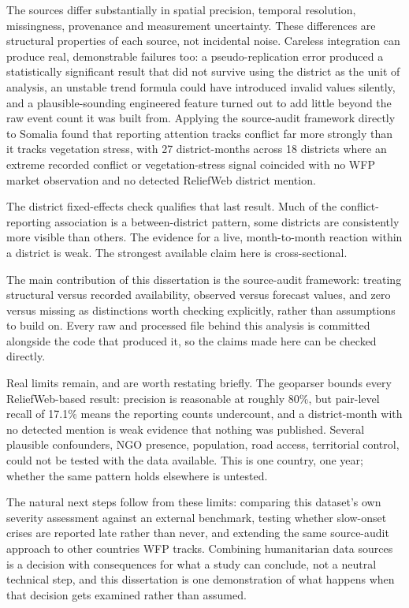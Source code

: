 \documentclass[12pt,a4paper]{article}
\begin{document}
The sources differ substantially in spatial precision, temporal resolution, missingness, provenance and measurement uncertainty. These differences are structural properties of each source, not incidental noise. Careless integration can produce real, demonstrable failures too: a pseudo-replication error produced a statistically significant result that did not survive using the district as the unit of analysis, an unstable trend formula could have introduced invalid values silently, and a plausible-sounding engineered feature turned out to add little beyond the raw event count it was built from. Applying the source-audit framework directly to Somalia found that reporting attention tracks conflict far more strongly than it tracks vegetation stress, with 27 district-months across 18 districts where an extreme recorded conflict or vegetation-stress signal coincided with no WFP market observation and no detected ReliefWeb district mention.

The district fixed-effects check qualifies that last result. Much of the conflict-reporting association is a between-district pattern, some districts are consistently more visible than others. The evidence for a live, month-to-month reaction within a district is weak. The strongest available claim here is cross-sectional.

The main contribution of this dissertation is the source-audit framework: treating structural versus recorded availability, observed versus forecast values, and zero versus missing as distinctions worth checking explicitly, rather than assumptions to build on. Every raw and processed file behind this analysis is committed alongside the code that produced it, so the claims made here can be checked directly.

Real limits remain, and are worth restating briefly. The geoparser bounds every ReliefWeb-based result: precision is reasonable at roughly 80\%, but pair-level recall of 17.1\% means the reporting counts undercount, and a district-month with no detected mention is weak evidence that nothing was published. Several plausible confounders, NGO presence, population, road access, territorial control, could not be tested with the data available. This is one country, one year; whether the same pattern holds elsewhere is untested.

The natural next steps follow from these limits: comparing this dataset's own severity assessment against an external benchmark, testing whether slow-onset crises are reported late rather than never, and extending the same source-audit approach to other countries WFP tracks. Combining humanitarian data sources is a decision with consequences for what a study can conclude, not a neutral technical step, and this dissertation is one demonstration of what happens when that decision gets examined rather than assumed.
\end{document}
